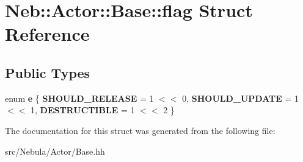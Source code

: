 \hypertarget{structNeb_1_1Actor_1_1Base_1_1flag}{\section{Neb\-:\-:Actor\-:\-:Base\-:\-:flag Struct Reference}
\label{structNeb_1_1Actor_1_1Base_1_1flag}
}
\subsection*{Public Types}
\begin{DoxyCompactItemize}
\item 
enum {\bfseries e} \{ {\bfseries S\-H\-O\-U\-L\-D\-\_\-\-R\-E\-L\-E\-A\-S\-E} = 1 $<$$<$ 0, 
{\bfseries S\-H\-O\-U\-L\-D\-\_\-\-U\-P\-D\-A\-T\-E} = 1 $<$$<$ 1, 
{\bfseries D\-E\-S\-T\-R\-U\-C\-T\-I\-B\-L\-E} = 1 $<$$<$ 2
 \}
\end{DoxyCompactItemize}


The documentation for this struct was generated from the following file\-:\begin{DoxyCompactItemize}
\item 
src/\-Nebula/\-Actor/Base.\-hh\end{DoxyCompactItemize}
